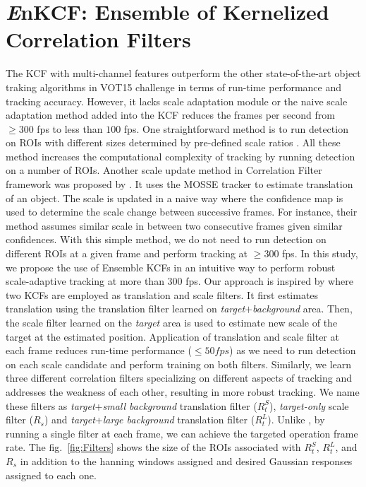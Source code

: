 \documentclass[10pt,twocolumn,letterpaper]{article}
\newcounter{ct}
\begin{document}
\section{{\it E}nKCF: Ensemble of Kernelized Correlation Filters}

The KCF with multi-channel features outperform the other
state-of-the-art object traking algorithms in VOT15 challenge in terms of run-time
performance and tracking accuracy. However, it lacks scale adaptation
module or the naive scale adaptation method added into the KCF reduces
the frames per second from $\geq300$ fps to less than $100$ fps. One
straightforward method is to run detection on ROIs with different
sizes determined by pre-defined scale ratios
\cite{henriques2015high,tang2015multi,ma2015long,bibi2015multi,li2014scale}. All
these method increases the computational complexity of tracking by
running detection on a number of ROIs. Another scale update method in
Correlation Filter framework was proposed by \cite{zhang2014fast}. It
uses the MOSSE tracker to estimate translation of an object. The scale
is updated in a naive way where the confidence map is used to
determine the scale change between successive frames. For instance,
their method assumes similar scale in between two consecutive frames
given similar confidences. With this simple method, we do not need to
run detection on different ROIs at a given frame and perform tracking
at $\geq300$ fps. In this study, we propose the use of Ensemble KCFs
in an intuitive way to perform robust scale-adaptive tracking at more
than $300$ fps. Our approach is inspired by \cite{ma2015long} where
two KCFs are employed as translation and scale filters. It first
estimates translation using the translation filter learned on
\textit{target}$+$\textit{background} area. Then, the scale filter
learned on the \textit{target} area is used to estimate new scale of
the target at the estimated position. Application of translation and
scale filter at each frame reduces run-time performance ($\leq50 fps$)
as we need to run detection on each scale candidate and perform training on both filters. Similarly,
we learn three different correlation filters specializing on different
aspects of tracking and addresses the weakness of each other,
resulting in more robust tracking. We name these filters as
\textit{target}+\textit{small background} translation filter
($R_{t}^{S}$), \textit{target-only} scale filter ($R_{s}$) and
\textit{target}+\textit{large background} translation filter
($R_{t}^{L}$). Unlike \cite{ma2015long}, by running a single filter at
each frame, we can achieve the targeted operation frame rate. The
fig.~\ref{fig:Filters} shows the size of the ROIs associated with
$R_{t}^{S}$, $R_{t}^{L}$, and $R_{s}$ in addition to the hanning
windows assigned and desired Gaussian responses assigned to each one.
\end{document}
